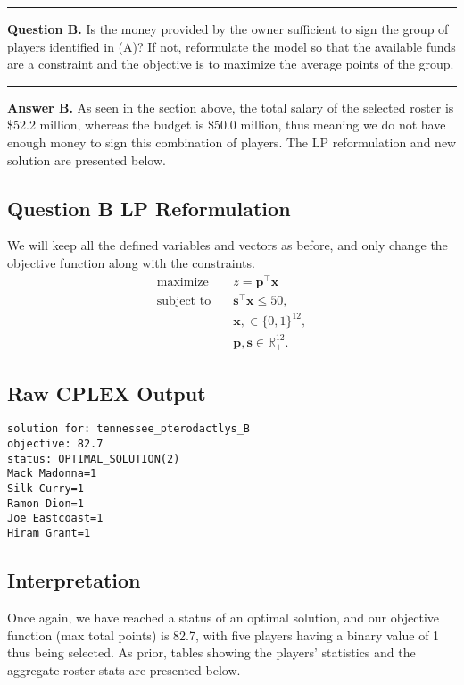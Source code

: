 \documentclass[a4paper,11pt]{article}
\newcommand{\vsp}{\vspace{0.5em}}
\newcommand{\ruler}{
    \vspace{1em}
    \hrule
    \vspace{1em}
}
\begin{document}
\ruler

\vsp

\textbf{Question B.} 
Is the money provided by the owner sufficient to sign the group of players identified in (A)? If not, reformulate the model so that the available funds are a constraint and the objective is to maximize the average points of the group.

\ruler

\textbf{Answer B.} As seen in the section above, the total salary of the selected roster is \$52.2 million, whereas the budget is \$50.0 million, thus meaning we do not have enough money to sign this combination of players. The LP reformulation and new solution are presented below.

\subsection{Question B LP Reformulation}

We will keep all the defined variables and vectors as before, and only change the objective function along with the constraints.
\[
\begin{aligned}
\text{maximize} \quad & z=\bm{p}^\top\bm{x}\\
\text{subject to}\quad
&\bm{s}^\top\bm{x} \leq 50, \\
&\bm{x}, \in \{0,1\}^{12}, \\
&\bm{p}, \bm{s}  \in \mathbb{R}_+^{12}.
\end{aligned}
\]

\subsection{Raw CPLEX Output}
\begin{verbatim}
solution for: tennessee_pterodactlys_B
objective: 82.7
status: OPTIMAL_SOLUTION(2)
Mack Madonna=1
Silk Curry=1
Ramon Dion=1
Joe Eastcoast=1
Hiram Grant=1
\end{verbatim}

\subsection{Interpretation}
Once again, we have reached a status of an optimal solution, and our objective function (max total points) is 82.7, with five players having a binary value of 1 thus being selected. As prior, tables showing the players' statistics and the aggregate roster stats are presented below.
\end{document}
